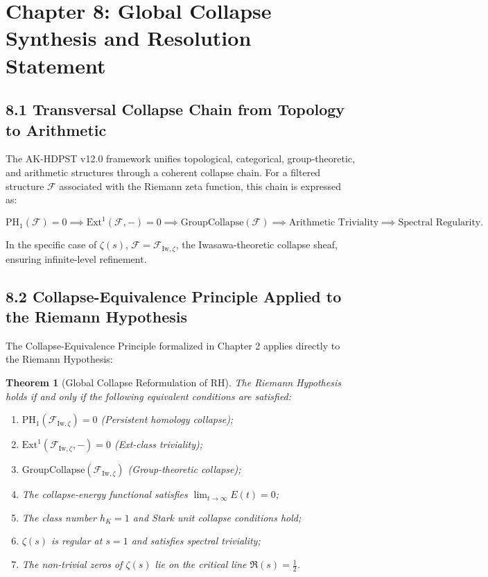 \documentclass[11pt]{article}
\newtheorem{theorem}{Theorem}[section]
\begin{document}
\section{Chapter 8: Global Collapse Synthesis and Resolution Statement}

\subsection*{8.1 Transversal Collapse Chain from Topology to Arithmetic}

The AK-HDPST v12.0 framework unifies topological, categorical, group-theoretic, and arithmetic structures through a coherent collapse chain. For a filtered structure $\mathcal{F}$ associated with the Riemann zeta function, this chain is expressed as:

\[
\mathrm{PH}_1(\mathcal{F}) = 0 \implies \mathrm{Ext}^1(\mathcal{F}, -) = 0 \implies \mathrm{GroupCollapse}(\mathcal{F}) \implies \text{Arithmetic Triviality} \implies \text{Spectral Regularity}.
\]

In the specific case of $\zeta(s)$, $\mathcal{F} = \mathcal{F}_{\mathrm{Iw}, \zeta}$, the Iwasawa-theoretic collapse sheaf, ensuring infinite-level refinement.

\subsection*{8.2 Collapse-Equivalence Principle Applied to the Riemann Hypothesis}

The Collapse-Equivalence Principle formalized in Chapter 2 applies directly to the Riemann Hypothesis:

\begin{theorem}[Global Collapse Reformulation of RH]
The Riemann Hypothesis holds if and only if the following equivalent conditions are satisfied:

\begin{enumerate}
    \item $\mathrm{PH}_1(\mathcal{F}_{\mathrm{Iw}, \zeta}) = 0$ \quad (Persistent homology collapse);
    \item $\mathrm{Ext}^1(\mathcal{F}_{\mathrm{Iw}, \zeta}, -) = 0$ \quad (Ext-class triviality);
    \item $\mathrm{GroupCollapse}(\mathcal{F}_{\mathrm{Iw}, \zeta})$ \quad (Group-theoretic collapse);
    \item The collapse-energy functional satisfies $\displaystyle \lim_{t \to \infty} E(t) = 0$;
    \item The class number $h_K = 1$ and Stark unit collapse conditions hold;
    \item $\zeta(s)$ is regular at $s = 1$ and satisfies spectral triviality;
    \item The non-trivial zeros of $\zeta(s)$ lie on the critical line $\Re(s) = \tfrac{1}{2}$.
\end{enumerate}
\end{theorem}
\end{document}
